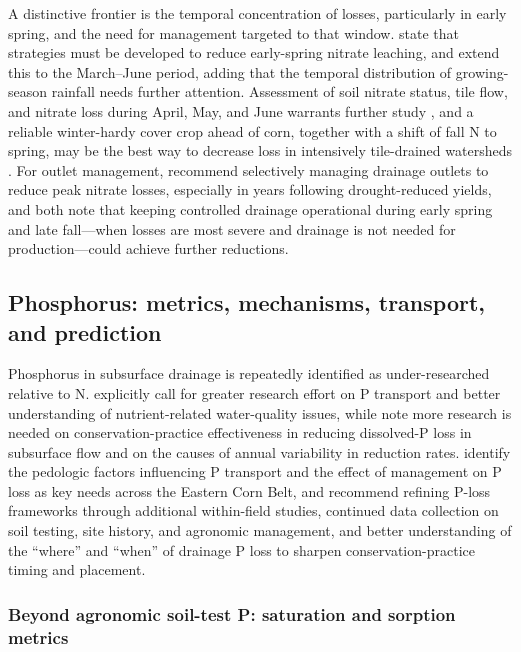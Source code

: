 \documentclass[11pt]{article}
\begin{document}
A distinctive frontier is the temporal concentration of losses, particularly in early spring, and the need for management targeted to that window. \textcite{Bakhsh2007} state that strategies must be developed to reduce early-spring nitrate leaching, and \textcite{Bakhsh2010} extend this to the March--June period, adding that the temporal distribution of growing-season rainfall needs further attention. Assessment of soil nitrate status, tile flow, and nitrate loss during April, May, and June warrants further study \parencite{Nance2007}, and a reliable winter-hardy cover crop ahead of corn, together with a shift of fall N to spring, may be the best way to decrease loss in intensively tile-drained watersheds \parencite{Gentry2024}. For outlet management, \textcite{Skaggs1995} recommend selectively managing drainage outlets to reduce peak nitrate losses, especially in years following drought-reduced yields, and both \textcite{Elmi2004,Elmi2002} note that keeping controlled drainage operational during early spring and late fall---when losses are most severe and drainage is not needed for production---could achieve further reductions.

\subsection{Phosphorus: metrics, mechanisms, transport, and prediction}

Phosphorus in subsurface drainage is repeatedly identified as under-researched relative to N. \textcite{Hertzberger2019} explicitly call for greater research effort on P transport and better understanding of nutrient-related water-quality issues, while \textcite{Yuan2022} note more research is needed on conservation-practice effectiveness in reducing dissolved-P loss in subsurface flow and on the causes of annual variability in reduction rates. \textcite{Pease2018} identify the pedologic factors influencing P transport and the effect of management on P loss as key needs across the Eastern Corn Belt, and \textcite{deOliveira2022} recommend refining P-loss frameworks through additional within-field studies, continued data collection on soil testing, site history, and agronomic management, and better understanding of the ``where'' and ``when'' of drainage P loss to sharpen conservation-practice timing and placement.

\subsubsection{Beyond agronomic soil-test P: saturation and sorption metrics}
\end{document}
